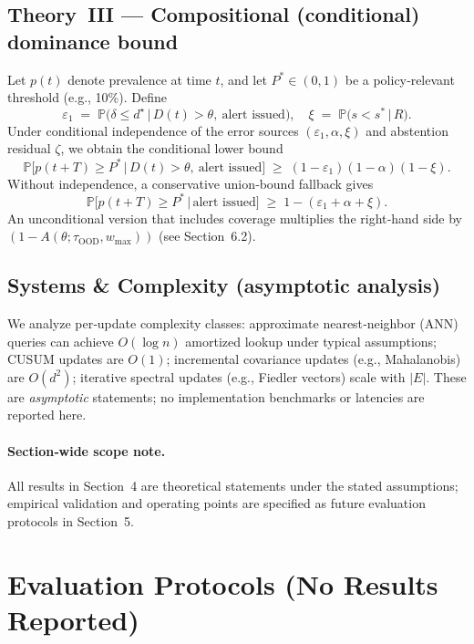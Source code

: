 \documentclass[11pt]{article}
\begin{document}
\subsection{Theory III — Compositional (conditional) dominance bound}
Let $p(t)$ denote prevalence at time $t$, and let $P^*\in(0,1)$ be a policy‑relevant threshold (e.g., 10\%). Define
\[
\varepsilon_1 \;=\; \mathbb{P}\!\big(\delta \le d^\star \,\big|\, D(t)>\theta,\ \text{alert issued}\big),\quad
\xi \;=\; \mathbb{P}\!\big(s < s^* \,\big|\, R\big).
\]
Under conditional independence of the error sources $(\varepsilon_1,\alpha,\xi)$ and abstention residual $\zeta$, we obtain the conditional lower bound
\begin{equation}
\mathbb{P}\!\big[p(t{+}T)\ge P^* \,\big|\, D(t)>\theta,\ \text{alert issued}\big]
\;\ge\; (1-\varepsilon_1)(1-\alpha)(1-\xi).
\end{equation}
Without independence, a conservative union‑bound fallback gives
\[
\mathbb{P}\!\big[p(t{+}T)\ge P^* \,\big|\, \text{alert issued}\big]\;\ge\; 1-(\varepsilon_1+\alpha+\xi).
\]
An unconditional version that includes coverage multiplies the right‑hand side by $(1-A(\theta;\tau_{\text{OOD}},w_{\max}))$ (see Section~6.2).

\subsection{Systems \& Complexity (asymptotic analysis)}
We analyze per‑update complexity classes: approximate nearest‑neighbor (ANN) queries can achieve $O(\log n)$ amortized lookup under typical assumptions; CUSUM updates are $O(1)$; incremental covariance updates (e.g., Mahalanobis) are $O(d^2)$; iterative spectral updates (e.g., Fiedler vectors) scale with $|E|$. These are \emph{asymptotic} statements; no implementation benchmarks or latencies are reported here.

\paragraph{Section‑wide scope note.}
All results in Section~4 are theoretical statements under the stated assumptions; empirical validation and operating points are specified as future evaluation protocols in Section~5.


\section{Evaluation Protocols (No Results Reported)}
\end{document}
